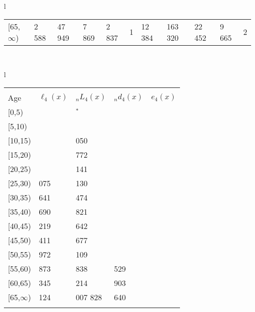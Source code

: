 \documentclass[
]{article}
\begin{document}
\begin{table}
\begin{tabular}[t]{l}
\begin{tabular}
{}[65,$\infty$) & 2 588 & 47 949 & 7 869 & 2 837 & 1 & 12 384 & 163 320 & 22 452 & 9 665 & 2\\
\end{tabular}\\
\end{tabular}
\centering
\begin{tabular}[t]{l}
\hline
\begin{tabular}{>{\raggedright\arraybackslash}p{.43in}>{\raggedleft\arraybackslash}p{1.3in}>{\raggedleft\arraybackslash}p{1.3in}>{\raggedleft\arraybackslash}p{1.3in}>{\raggedleft\arraybackslash}p{1.3in}}
\toprule
\multicolumn{1}{c}{ } & \multicolumn{4}{c}{(4) Lost both} \\
\cmidrule(l{3pt}r{3pt}){2-5}
Age & $\ell_{4}(x)$ & ${}_nL_{4}(x)$ & ${}_nd_{4}(x)$ & $e_{4}(x)$\\
\midrule
{}[0,5) & 0 & 178$^{*}$ & 0 & 16\\
{}[5,10) & 139 & 915 & 0 & 16\\
{}[10,15) & 207 & 1 050 & 0 & 16\\
{}[15,20) & 268 & 1 772 & 1 & 16\\
{}[20,25) & 611 & 4 141 & 6 & 16\\
\addlinespace
{}[25,30) & 1 075 & 8 130 & 15 & 16\\
{}[30,35) & 1 641 & 14 474 & 30 & 16\\
{}[35,40) & 2 690 & 21 821 & 56 & 16\\
{}[40,45) & 4 219 & 35 642 & 117 & 16\\
{}[45,50) & 7 411 & 60 677 & 276 & 16\\
\addlinespace
{}[50,55) & 12 972 & 97 109 & 660 & 16\\
{}[55,60) & 22 873 & 142 838 & 1 529 & 15\\
{}[60,65) & 30 345 & 184 214 & 2 903 & 14\\
{}[65,$\infty$) & 43 124 & 1 007 828 & 59 640 & 13\\
\bottomrule
\multicolumn{5}{l}{\rule{0pt}{1em}\textsuperscript{*} Based on an estimated from SIPP with less than 10 respondents in the numerator.}\\
\end{tabular}\\
\end{tabular}
\end{table}
\end{document}

